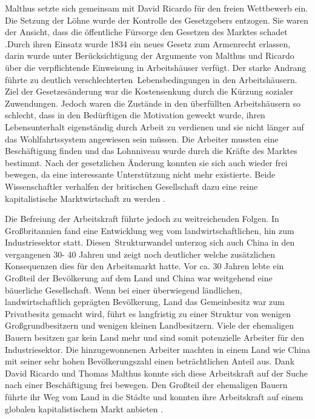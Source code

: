 Malthus setzte sich gemeinsam mit David Ricardo f{\"u}r den freien Wettbewerb ein. Die Setzung der L{\"o}hne wurde der Kontrolle des Gesetzgebers entzogen. Sie waren der Ansicht, dass die {\"o}ffentliche F{\"u}rsorge den Gesetzen des Marktes schadet \citep{Fischer.1972,Baek.2010}.\newline Durch ihren Einsatz wurde 1834 ein neues Gesetz zum Armenrecht erlassen, darin wurde unter Ber{\"u}cksichtigung der Argumente von Malthus und Ricardo {\"u}ber die verpflichtende Einweisung in Arbeitsh{\"a}user verf{\"u}gt. Der starke Andrang f{\"u}hrte zu deutlich verschlechterten~Lebensbedingungen in den Arbeitsh{\"a}usern. Ziel der Gesetzes{\"a}nderung war die Kostensenkung durch die K{\"u}rzung sozialer Zuwendungen. Jedoch waren die Zust{\"a}nde in den {\"u}berf{\"u}llten Arbeitsh{\"a}usern so schlecht, dass in den Bed{\"u}rftigen die Motivation geweckt wurde, ihren Lebensunterhalt eigenst{\"a}ndig durch Arbeit zu verdienen und sie nicht l{\"a}nger auf das Wohlfahrtssystem angewiesen sein m{\"u}ssen. Die Arbeiter mussten eine Besch{\"a}ftigung finden und das Lohnniveau wurde durch die Kr{\"a}fte des Marktes bestimmt. Nach der gesetzlichen {\"A}nderung konnten sie sich auch wieder frei bewegen, da eine interessante Unterst{\"u}tzung nicht mehr existierte. Beide Wissenschaftler verhalfen der britischen Gesellschaft dazu eine reine kapitalistische Marktwirtschaft zu werden \citep{Wende.2001}.\newline


Die Befreiung der Arbeitskraft f{\"u}hrte jedoch zu weitreichenden Folgen. In Gro{\ss}britannien fand eine Entwicklung weg vom landwirtschaftlichen, hin zum Industriesektor statt. Diesen~Strukturwandel unterzog sich auch China in den vergangenen 30- 40 Jahren und zeigt noch deutlicher welche zus{\"a}tzlichen Konsequenzen dies f{\"u}r den Arbeitsmarkt hatte.  Vor ca. 30 Jahren lebte ein Gro{\ss}teil der Bev{\"o}lkerung auf dem Land und China war weitgehend eine b{\"a}uerliche Gesellschaft. Wenn bei einer {\"u}berwiegend l{\"a}ndlichen, landwirtschaftlich gepr{\"a}gten Bev{\"o}lkerung, Land das Gemeinbesitz war zum Privatbesitz gemacht wird, f{\"u}hrt es langfristig zu einer Struktur von wenigen Gro{\ss}grundbesitzern und wenigen kleinen Landbesitzern. Viele der ehemaligen Bauern besitzen gar kein Land mehr und  sind somit potenzielle Arbeiter f{\"u}r den Industriesektor. Die hinzugewonnenen Arbeiter machten in einem Land wie China mit seiner sehr hohen Bev{\"o}lkerungszahl einen betr{\"a}chtlichen Anteil aus. Dank David Ricardo und Thomas Malthus konnte sich diese Arbeitskraft auf der Suche nach einer Besch{\"a}ftigung frei bewegen. Den Gro{\ss}teil der ehemaligen Bauern f{\"u}hrte ihr Weg vom Land in die St{\"a}dte und konnten ihre Arbeitskraft auf einem globalen kapitalistischem Markt anbieten \citep{Franke.2013,Menzel.2013,Reisach.1997}.\newline


